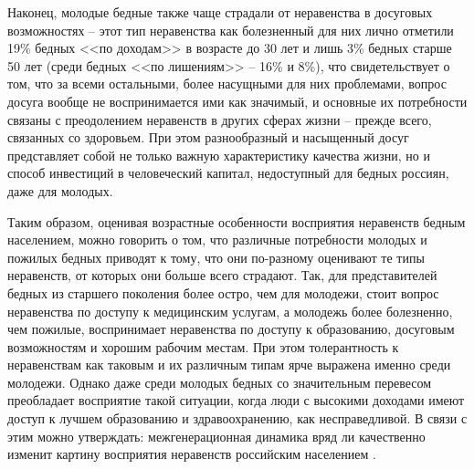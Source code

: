 Наконец, молодые бедные также чаще страдали от неравенства в досуговых 
возможностях -- этот тип неравенства как болезненный для них лично отметили 
19\% бедных <<по доходам>> в возрасте до 30 лет и лишь 3\% бедных старше 50 лет 
(среди бедных <<по лишениям>> -- 16\% и 8\%), что свидетельствует о том, что за 
всеми остальными, более насущными для них проблемами, вопрос досуга вообще не 
воспринимается ими как значимый, и основные их потребности связаны с 
преодолением неравенств в других сферах жизни -- прежде всего, связанных со 
здоровьем. При этом разнообразный и насыщенный досуг представляет собой не 
только важную характеристику качества жизни, но и способ инвестиций в 
человеческий капитал, недоступный для бедных россиян, даже для молодых.

Таким образом, оценивая возрастные особенности восприятия неравенств бедным 
населением, можно говорить о том, что различные потребности молодых и пожилых 
бедных приводят к тому, что они по-разному оценивают те типы неравенств, от 
которых они больше всего страдают. Так, для представителей бедных из старшего 
поколения более остро, чем для молодежи, стоит вопрос неравенства по доступу 
к медицинским услугам, а молодежь более болезненно, чем пожилые, воспринимает 
неравенства по доступу к образованию, досуговым возможностям и хорошим рабочим 
местам. При этом толерантность к неравенствам как таковым и их различным типам 
ярче выражена именно среди молодежи. Однако даже среди молодых бедных со 
значительным перевесом преобладает восприятие такой ситуации, когда люди с 
высокими доходами имеют доступ к лучшем образованию и здравоохранению, как 
несправедливой. В связи с этим можно утверждать: межгенерационная динамика 
вряд ли качественно изменит картину восприятия неравенств российским 
населением \cite{vestnik}.